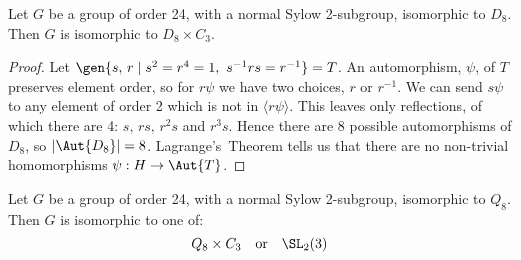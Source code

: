 \begin{lemma}
    Let \(G\) be a group of order 24, with a normal Sylow 2-subgroup, isomorphic to \(D_8\).
    Then \(G\) is isomorphic to \(D_8 \times C_3\).
\end{lemma}

\begin{proof}
    Let \(\gen{s,\,r \mid s^2 = r^4 = 1,\ s^{-1}rs = r^{-1}} = T\).
    An automorphism, \(\psi\), of \(T\) preserves element order, so for \(r\psi\) we have two choices, \(r\) or
    \(r^{-1}\).
    We can send \(s\psi\) to any element of order 2 which is not in \(\langle r\psi \rangle\).
    This leaves only reflections, of which there are 4: \(s,\,rs,\,r^2s\) and \(r^3s\).
    Hence there are 8 possible automorphisms of \(D_8\), so \(|\Aut{D_8}| = 8\).
    Lagrange's~Theorem tells us that there are no non-trivial homomorphisms \(\psi:H \to \Aut{T}\).
\end{proof}

\begin{lemma}\label{lem:24_last}
    Let \(G\) be a group of order 24, with a normal Sylow 2-subgroup, isomorphic to \(Q_8\).
    Then \(G\) is isomorphic to one of:
    \[
        Q_8 \times C_3 \quad \text{or} \quad%
        \SL_2(3)
    \]
\end{lemma}

